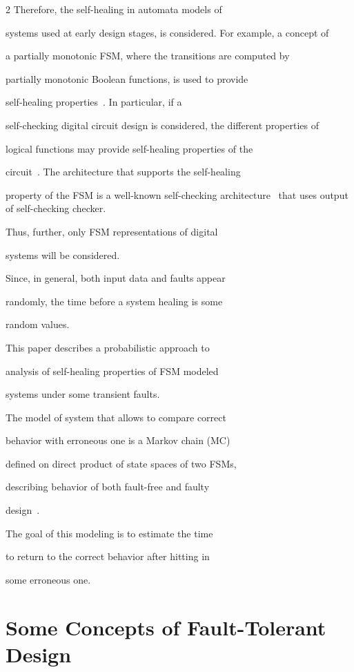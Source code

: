 \begin{multicols}{2}
Therefore,  the self-healing in automata models of

systems used at early design stages, is considered. For example, a concept of

a partially monotonic FSM, where the transitions are computed by

partially monotonic Boolean functions, is used to provide

self-healing properties~\cite{6fr}. In particular, if  a

self-checking digital circuit design is considered, the different properties of

logical functions may provide self-healing properties of the

circuit~\cite{6fr}. The architecture that supports the self-healing

property of the FSM is a well-known self-checking architecture~\cite{6fr} that uses output of self-checking checker.

Thus, further,  only FSM representations of digital

systems will be considered.



Since, in general, both input data and faults appear

randomly, the time before a system healing is some

random values.



This paper describes a probabilistic approach to

analysis of self-healing properties of FSM modeled

systems under some transient faults.

The model of system that allows to compare correct

behavior with erroneous one is a Markov chain (MC)

defined on direct product of state spaces of two FSMs,

describing behavior of both fault-free and faulty

design~\cite{7fr, 8fr}.

The goal of this modeling is to estimate the time

to return to the correct behavior after hitting in

some erroneous one.




\section{Some Concepts of Fault-Tolerant Design}




\end{multicols}
